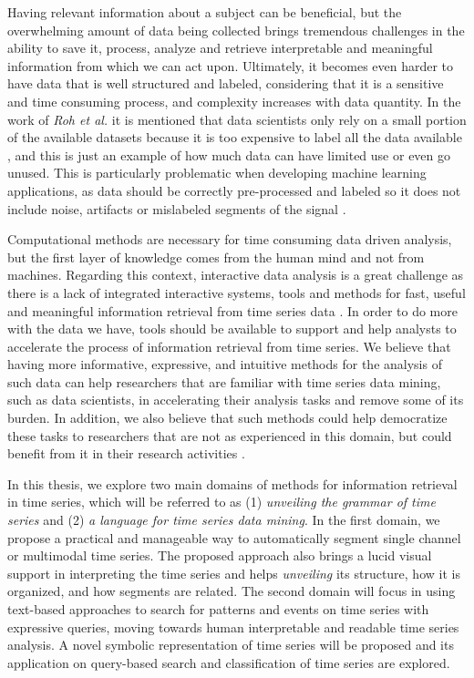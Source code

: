 Having relevant information about a subject can be beneficial, but the overwhelming amount of data being collected brings tremendous challenges in the ability to save it, process, analyze and retrieve interpretable and meaningful information from which we can act upon\cite{bigdata}. Ultimately, it becomes even harder to have data that is well structured and labeled, considering that it is a sensitive and time consuming process, and complexity increases with data quantity. In the work of \textit{Roh et al.} it is mentioned that data scientists only rely on a small portion of the available datasets because it is too expensive to label all the data available \cite{roh2019survey}, and this is just an example of how much data can have limited use or even go unused. This is particularly problematic when developing machine learning applications, as data should be correctly pre-processed and labeled so it does not include noise, artifacts or mislabeled segments of the signal \cite{roh2019survey}. 

Computational methods are necessary for time consuming data driven analysis, but the first layer of knowledge comes from the human mind and not from machines. Regarding this context, interactive data analysis is a great challenge as there is a lack of integrated interactive systems, tools and methods for fast, useful and meaningful information retrieval from time series data \cite{intuition1, intuition2, holzinger, machado2015}. In order to do more with the data we have, tools should be available to support and help analysts to accelerate the process of information retrieval from time series. We believe that having more informative, expressive, and intuitive methods for the analysis of such data can help researchers that are familiar with time series data mining, such as data scientists, in accelerating their analysis tasks and remove some of its burden. In addition, we also believe that such methods could help democratize these tasks to researchers that are not as experienced in this domain, but could benefit from it in their research activities \cite{democratize}.

In this thesis, we explore two main domains of methods for information retrieval in time series, which will be referred to as (1) \textit{unveiling the grammar of time series} and (2) \textit{a language for time series data mining}. In the first domain, we propose a practical and manageable way to automatically segment single channel or multimodal time series. The proposed approach also brings a lucid visual support in interpreting the time series and helps \textit{unveiling} its structure, how it is organized, and how segments are related. The second domain will focus in using text-based approaches to search for patterns and events on time series with expressive queries, moving towards human interpretable and readable time series analysis. A novel symbolic representation of time series will be proposed and its application on query-based search and classification of time series are explored.

